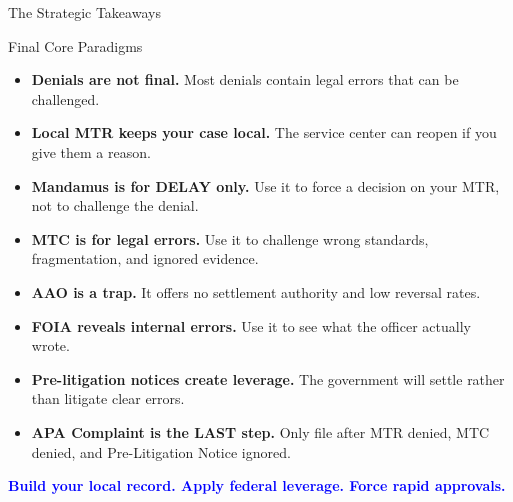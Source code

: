 \documentclass[11pt]{beamer}
\begin{document}
	
	\begin{frame}{The Strategic Takeaways}
		\scriptsize
		\begin{block}{Final Core Paradigms}
			\begin{itemize}
				\item \textbf{Denials are not final.} Most denials contain legal errors that can be challenged.
				\item \textbf{Local MTR keeps your case local.} The service center can reopen if you give them a reason.
				\item \textbf{Mandamus is for DELAY only.} Use it to force a decision on your MTR, not to challenge the denial.
				\item \textbf{MTC is for legal errors.} Use it to challenge wrong standards, fragmentation, and ignored evidence.
				\item \textbf{AAO is a trap.} It offers no settlement authority and low reversal rates.
				\item \textbf{FOIA reveals internal errors.} Use it to see what the officer actually wrote.
				\item \textbf{Pre-litigation notices create leverage.} The government will settle rather than litigate clear errors.
				\item \textbf{APA Complaint is the LAST step.} Only file after MTR denied, MTC denied, and Pre-Litigation Notice ignored.
			\end{itemize}
			\vspace{0.3cm}
			\centering
			\textcolor{blue}{\textbf{Build your local record. Apply federal leverage. Force rapid approvals.}}
		\end{block}
	\end{frame}
	
\end{document}
